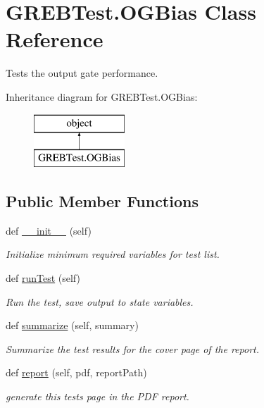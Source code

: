 \hypertarget{class_g_r_e_b_test_1_1_o_g_bias}{}\section{G\+R\+E\+B\+Test.\+O\+G\+Bias Class Reference}
\label{class_g_r_e_b_test_1_1_o_g_bias}


Tests the output gate performance.  


Inheritance diagram for G\+R\+E\+B\+Test.\+O\+G\+Bias\+:\begin{figure}[H]
\begin{center}
\leavevmode
\includegraphics[height=2.000000cm]{class_g_r_e_b_test_1_1_o_g_bias}
\end{center}
\end{figure}
\subsection*{Public Member Functions}
\begin{DoxyCompactItemize}
\item 
def \hyperlink{class_g_r_e_b_test_1_1_o_g_bias_a8182fe6319290d1e1af761949871663e}{\+\_\+\+\_\+init\+\_\+\+\_\+} (self)
\begin{DoxyCompactList}\small\item\em Initialize minimum required variables for test list. \end{DoxyCompactList}\item 
def \hyperlink{class_g_r_e_b_test_1_1_o_g_bias_aaeb638ec031afb104579b968c72ee06c}{run\+Test} (self)
\begin{DoxyCompactList}\small\item\em Run the test, save output to state variables. \end{DoxyCompactList}\item 
def \hyperlink{class_g_r_e_b_test_1_1_o_g_bias_a22a9b5a43ccd76f58b6109446a34015a}{summarize} (self, summary)
\begin{DoxyCompactList}\small\item\em Summarize the test results for the cover page of the report. \end{DoxyCompactList}\item 
def \hyperlink{class_g_r_e_b_test_1_1_o_g_bias_ad0814258580f121c9ba1a5b730d9bac4}{report} (self, pdf, report\+Path)
\begin{DoxyCompactList}\small\item\em generate this test\textquotesingle{}s page in the P\+DF report. \end{DoxyCompactList}\end{DoxyCompactItemize}


